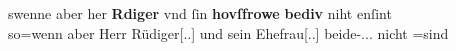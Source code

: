 \begin{exe}
\ex \label{ex:gendres2}
		\gll swenne aber her \textbf{Rdiger} vnd ſin
			\textbf{hovſfrowe} \textbf{bediv} niht enſint\\
			so=wenn aber Herr Rüdiger[\Nom.\Sg.\MascM] und sein
			Ehefrau[\Nom.\Sg.\FemF] beide-\Nom.\Pl.\NeutMF.\St{} nicht
			\Neg=sind\\
		\begin{taggedline}{\parencites(Regensburg, 1299)[\pno~3262, 425.13--14]{cao4}}
		\trans {}
		\end{taggedline}


\end{exe}
